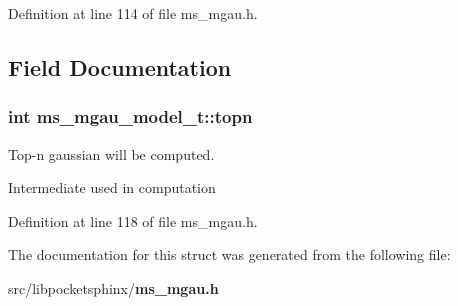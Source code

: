 \-Definition at line 114 of file ms\-\_\-mgau.\-h.



\subsection{\-Field \-Documentation}
\subsubsection[{topn}]{\setlength{\rightskip}{0pt plus 5cm}int {\bf ms\-\_\-mgau\-\_\-model\-\_\-t\-::topn}}\label{structms__mgau__model__t_a0a67ef79bd74c55734b0944f0d61b668}


\-Top-\/n gaussian will be computed. 

\-Intermediate used in computation 

\-Definition at line 118 of file ms\-\_\-mgau.\-h.



\-The documentation for this struct was generated from the following file\-:\begin{DoxyCompactItemize}
\item 
src/libpocketsphinx/{\bf ms\-\_\-mgau.\-h}\end{DoxyCompactItemize}
